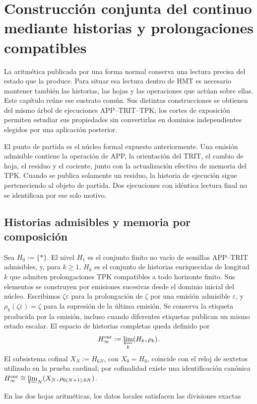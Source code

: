 \section{Construcción conjunta del continuo mediante historias y prolongaciones compatibles}
\label{iv:continuo-conjunto}
La aritmética publicada por una forma normal conserva una lectura precisa del estado que la produce. Para situar esa lectura dentro de HMT es necesario mantener también las historias, las hojas y las operaciones que actúan sobre ellas. Este capítulo reúne ese sustrato común. Sus distintas construcciones se obtienen del mismo árbol de ejecuciones APP–TRIT–TPK; los cortes de exposición permiten estudiar sus propiedades sin convertirlas en dominios independientes elegidos por una aplicación posterior.

El punto de partida es el núcleo formal expuesto anteriormente. Una emisión admisible contiene la operación de APP, la orientación del TRIT, el cambio de hoja, el residuo y el cociente, junto con la actualización efectiva de memoria del TPK. Cuando se publica solamente un residuo, la historia de ejecución sigue perteneciendo al objeto de partida. Dos ejecuciones con idéntica lectura final no se identifican por ese solo motivo.

\subsection{Historias admisibles y memoria por composición}
Sea \(H_0:=\{\ast\}\). El nivel \(H_1\) es el conjunto finito no vacío de
semillas APP--TRIT admisibles, y, para \(k\geq1\), \(H_k\) es el conjunto de
historias enriquecidas de longitud \(k\) que admiten prolongaciones TPK
compatibles a todo horizonte finito. Sus elementos se construyen por emisiones
sucesivas desde el dominio inicial del núcleo. Escribimos \(\zeta\varepsilon\)
para la prolongación de \(\zeta\) por una emisión admisible \(\varepsilon\), y
\(\rho_k(\zeta\varepsilon)=\zeta\) para la supresión de la última emisión. Se
conserva la etiqueta producida por la emisión, incluso cuando diferentes
etiquetas publican un mismo estado escalar. El espacio de historias completas
queda definido por
\[
 H_\infty^{\rm enr}:=\varprojlim_k(H_k,\rho_k).
\]
El subsistema cofinal \(X_N:=H_{6N}\), con \(X_0=H_0\), coincide con el reloj
de sextetos utilizado en la prueba cardinal; por cofinalidad existe una
identificación canónica
\(H_\infty^{\rm enr}\cong\varprojlim_N(X_N,\rho_{6(N+1),6N})\).

En las dos hojas aritméticas, los datos locales satisfacen las divisiones exactas


